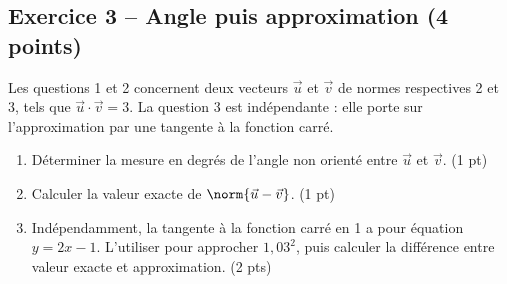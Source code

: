\subsection*{Exercice 3 -- Angle puis approximation (4 points)}
Les questions 1 et 2 concernent deux vecteurs $\vec u$ et $\vec v$ de normes respectives 2 et 3, tels que $\vec u\cdot\vec v=3$. La question 3 est indépendante : elle porte sur l’approximation par une tangente à la fonction carré.
\begin{enumerate}
\item Déterminer la mesure en degrés de l’angle non orienté entre $\vec u$ et $\vec v$. \hfill(1 pt)
\item Calculer la valeur exacte de $\norm{\vec u-\vec v}$. \hfill(1 pt)
\item Indépendamment, la tangente à la fonction carré en 1 a pour équation $y=2x-1$. L’utiliser pour approcher $1{,}03^2$, puis calculer la différence entre valeur exacte et approximation. \hfill(2 pts)
\end{enumerate}
